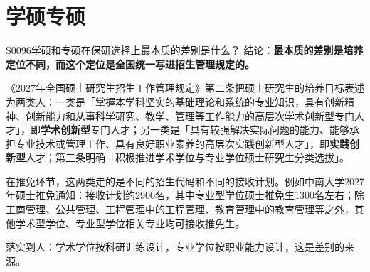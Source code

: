 \section{学硕专硕}
\begin{qa}{S0096}{学硕和专硕在保研选择上最本质的差别是什么？}
结论：\textbf{最本质的差别是培养定位不同，而这个定位是全国统一写进招生管理规定的。}

《2027年全国硕士研究生招生工作管理规定》第二条把硕士研究生的培养目标表述为两类人：一类是「掌握本学科坚实的基础理论和系统的专业知识，具有创新精神、创新能力和从事科学研究、教学、管理等工作能力的高层次学术创新型专门人才」，即\textbf{学术创新型}专门人才；另一类是「具有较强解决实际问题的能力、能够承担专业技术或管理工作、具有良好职业素养的高层次实践创新型人才」，即\textbf{实践创新型}人才；第三条明确「积极推进学术学位与专业学位硕士研究生分类选拔」。

在推免环节，这两类走的是不同的招生代码和不同的接收计划。例如中南大学2027年硕士推免通知：接收计划约2900名，其中专业型学位硕士推免生1300名左右；除工商管理、公共管理、工程管理中的工程管理、教育管理中的教育管理等之外，其他学术型学位、专业型学位相关专业均可接收推免生。

落实到人：学术学位按科研训练设计，专业学位按职业能力设计，这是差别的来源。
\end{qa}

